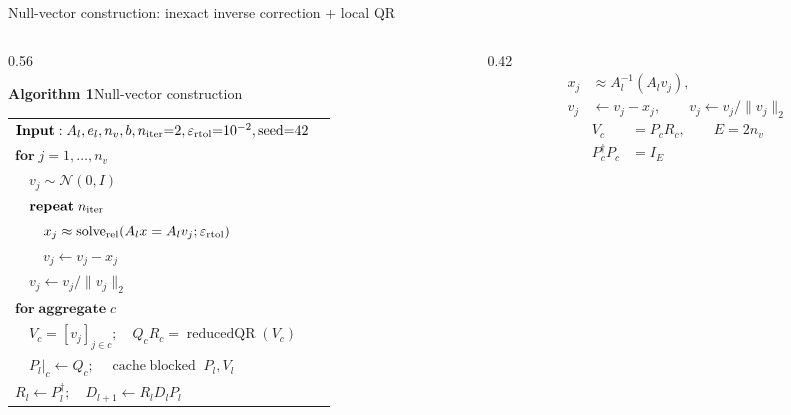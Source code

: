 \documentclass[UTF8,aspectratio=169,11pt,fontset=none]{ctexbeamer}
\begin{document}
\begin{frame}[t,shrink=5]{Null-vector construction: inexact inverse correction + local QR}
\begin{columns}[T,totalwidth=\textwidth]
\begin{column}{0.56\textwidth}
  \begin{center}
  \textbf{Algorithm 1}\quad Null-vector construction
  \end{center}
  \fontsize{9}{11}\selectfont
  \begin{tabular}{@{}>{\raggedright\arraybackslash}p{0.96\linewidth}@{}}
  \toprule
  \(\mathbf{Input:}\;A_l,e_l,n_v,b,n_{\rm iter}{=}2,
    \varepsilon_{\rm rtol}{=}10^{-2},\mathrm{seed}{=}42\)\\
  \(\mathbf{for}\;j=1,\ldots,n_v\)\\
  \(\quad v_j\sim\mathcal N(0,I)\)\\
  \(\quad\mathbf{repeat}\;n_{\rm iter}\)\\
  \(\quad\quad x_j\approx
    \operatorname{solve}_{\rm rel}(A_lx=A_lv_j;\varepsilon_{\rm rtol})\)\\
  \(\quad\quad v_j\leftarrow v_j-x_j\)\\
  \(\quad v_j\leftarrow v_j/\|v_j\|_2\)\\
  \(\mathbf{for\;aggregate}\;c\)\\
  \(\quad V_c=[v_j]_{j\in c};\quad
    Q_cR_c=\operatorname{reducedQR}(V_c)\)\\
  \(\quad P_l|_c\leftarrow Q_c;\quad
    \operatorname{cache\;blocked}\;P_l,V_l\)\\
  \(R_l\leftarrow P_l^\dagger;\quad
    D_{l+1}\leftarrow R_lD_lP_l\)\\
  \bottomrule
  \end{tabular}
\end{column}
\begin{column}{0.42\textwidth}
  \small
  \begin{equation}\tag{9}
  \begin{aligned}
  x_j&\approx A_l^{-1}(A_lv_j),\\
  v_j&\leftarrow v_j-x_j,\qquad
  v_j\leftarrow v_j/\|v_j\|_2
  \end{aligned}
  \end{equation}
  \begin{equation}\tag{10}
  \begin{aligned}
  V_c&=P_cR_c,\qquad E=2n_v\\
  P_c^\dagger P_c&=I_E
  \end{aligned}
  \end{equation}

\end{column}
\end{columns}
\end{frame}
\end{document}

